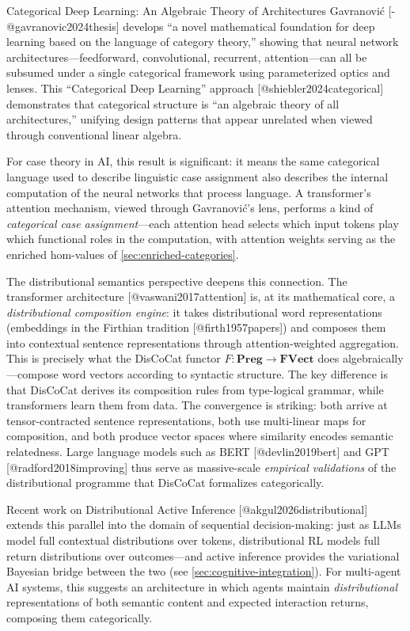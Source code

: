 \documentclass[
  ignorenonframetext,
]{beamer}
\begin{document}
\begin{frame}{Categorical Deep Learning: An Algebraic Theory of
Architectures}
\protect{}\label{categorical-deep-learning-an-algebraic-theory-of-architectures}
Gavranović {[}-@gavranovic2024thesis{]} develops ``a novel mathematical
foundation for deep learning based on the language of category theory,''
showing that neural network architectures---feedforward, convolutional,
recurrent, attention---can all be subsumed under a single categorical
framework using parameterized optics and lenses. This ``Categorical Deep
Learning'' approach {[}@shiebler2024categorical{]} demonstrates that
categorical structure is ``an algebraic theory of all architectures,''
unifying design patterns that appear unrelated when viewed through
conventional linear algebra.

For case theory in AI, this result is significant: it means the same
categorical language used to describe linguistic case assignment also
describes the internal computation of the neural networks that process
language. A transformer's attention mechanism, viewed through
Gavranović's lens, performs a kind of \emph{categorical case
assignment}---each attention head selects which input tokens play which
functional roles in the computation, with attention weights serving as
the enriched hom-values of \autoref{sec:enriched-categories}.

The distributional semantics perspective deepens this connection. The
transformer architecture {[}@vaswani2017attention{]} is, at its
mathematical core, a \emph{distributional composition engine}: it takes
distributional word representations (embeddings in the Firthian
tradition {[}@firth1957papers{]}) and composes them into contextual
sentence representations through attention-weighted aggregation. This is
precisely what the DisCoCat functor
\(F: \mathbf{Preg} \to \mathbf{FVect}\) does algebraically---compose
word vectors according to syntactic structure. The key difference is
that DisCoCat derives its composition rules from type-logical grammar,
while transformers learn them from data. The convergence is striking:
both arrive at tensor-contracted sentence representations, both use
multi-linear maps for composition, and both produce vector spaces where
similarity encodes semantic relatedness. Large language models such as
BERT {[}@devlin2019bert{]} and GPT {[}@radford2018improving{]} thus
serve as massive-scale \emph{empirical validations} of the
distributional programme that DisCoCat formalizes categorically.

Recent work on Distributional Active Inference
{[}@akgul2026distributional{]} extends this parallel into the domain of
sequential decision-making: just as LLMs model full contextual
distributions over tokens, distributional RL models full return
distributions over outcomes---and active inference provides the
variational Bayesian bridge between the two (see
\autoref{sec:cognitive-integration}). For multi-agent AI systems, this
suggests an architecture in which agents maintain \emph{distributional}
representations of both semantic content and expected interaction
returns, composing them categorically.
\end{frame}
\end{document}
